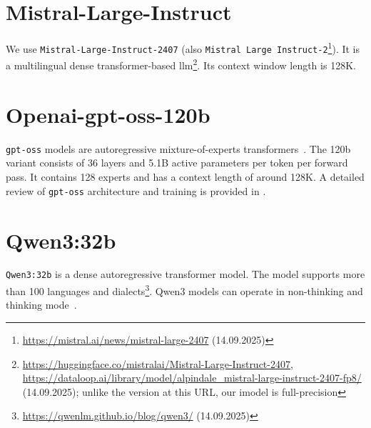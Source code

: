 \section{Mistral-Large-Instruct}

We use \texttt{Mistral-Large-Instruct-2407} (also \texttt{Mistral Large Instruct-2}\footnote{\url{https://mistral.ai/news/mistral-large-2407} (14.09.2025)}).
It is a multilingual dense transformer-based \ac{llm}\footnote{\url{https://huggingface.co/mistralai/Mistral-Large-Instruct-2407}, \url{https://dataloop.ai/library/model/alpindale_mistral-large-instruct-2407-fp8/}
(14.09.2025); unlike the version at this URL, our imodel is full-precision}.
Its context window length is 128K.

\section{Openai-gpt-oss-120b}

\texttt{gpt-oss} models are autoregressive mixture-of-experts transformers~\citep{openai2025gptoss120bgptoss20bmodel}.
The 120b variant consists of 36 layers and 5.1B active parameters per token per forward pass.
It contains 128 experts and has a context length of around 128K.
A detailed review of \texttt{gpt-oss} architecture and training is provided in \citep{openai2025gptoss120bgptoss20bmodel}.


\section{Qwen3:32b}
\texttt{Qwen3:32b} is a dense autoregressive transformer model.
The model supports more than 100 languages and dialects\footnote{\url{https://qwenlm.github.io/blog/qwen3/} (14.09.2025)}.
Qwen3 models can operate in non-thinking and thinking mode~\citep{qwen3_technical_report}.
